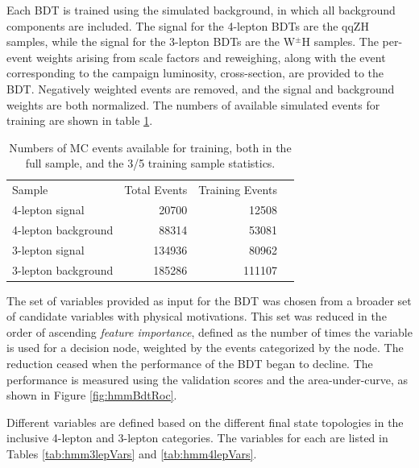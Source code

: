 Each BDT is trained using the simulated background, in which all background components are included.
The signal for the 4-lepton BDTs are the qqZH samples, while the signal for the 3-lepton BDTs are the W$^\pm$H samples.
The per-event weights arising from scale factors and reweighing, along with the event corresponding to the campaign luminosity, cross-section, are provided to the BDT.
Negatively weighted events are removed, and the signal and background weights are both normalized.
The numbers of available simulated events for training are shown in table \ref{tab:hmmSampleStatistics}.

\begin{table}[htbp]
 \begin{center}
\begin{tabular}{l r r r}\toprule
Sample               & Total Events & Training Events \\
4-lepton signal      & 20700        & 12508    \\
4-lepton background  & 88314        & 53081    \\
3-lepton signal      & 134936       & 80962    \\
3-lepton background  & 185286       & 111107   \\
\bottomrule\end{tabular} 
 \end{center}
 \caption{Numbers of MC events available for training, both in the full sample, and the 3/5 training sample statistics.}
\label{tab:hmmSampleStatistics}
\end{table}

The set of variables provided as input for the BDT was chosen from a broader set of candidate variables with physical motivations.
This set was reduced in the order of ascending \emph{feature importance}, defined as the number of times the variable is used for a decision node, weighted by the events categorized by the node.
The reduction ceased when the performance of the BDT began to decline.
The performance is measured using the validation scores and the area-under-curve, as shown in Figure \ref{fig:hmmBdtRoc}.

Different variables are defined based on the different final state topologies in the inclusive 4-lepton and 3-lepton categories.
The variables for each are listed in Tables \ref{tab:hmm3lepVars} and \ref{tab:hmm4lepVars}.

